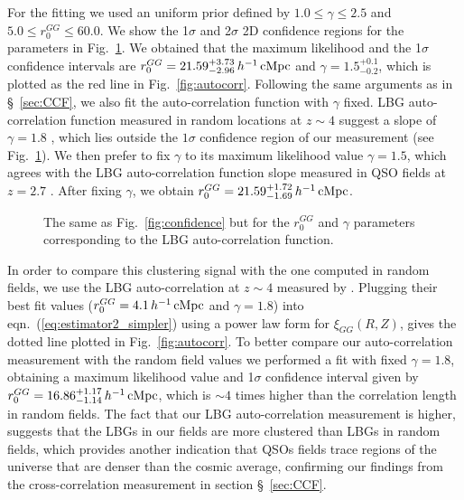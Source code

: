 \documentclass[iop, revtex4]{emulateapj}
\begin{document}
For the fitting we used an uniform prior
defined
by $1.0\leq \gamma \leq 2.5$ and $5.0\leq r^{GG}_{0} \leq 60.0$. We show 
the 1$\sigma$ and 2$\sigma$ 
2D confidence regions for the parameters in Fig.~\ref{fig:confidence_auto}. 
We obtained that the maximum
likelihood and the 1$\sigma$ confidence intervals are 
$r^{GG}_{0}=21.59^{+3.73}_{-2.96} \,h^{-1}\,{\rm cMpc}$ and
$\gamma=1.5^{+0.1}_{-0.2}$, which is
plotted as the red line in Fig.~\ref{fig:autocorr}.
Following the same arguments as in \S~\ref{sec:CCF}, 
we also fit the auto-correlation function with
$\gamma$ fixed. LBG auto-correlation function measured in random locations at $z\sim4$ 
suggest a slope of $\gamma=1.8$ \citep{Ouchi04b}, which lies
outside the  $1\sigma$ confidence region of our measurement (see
Fig.~\ref{fig:confidence_auto}). We then prefer to fix 
$\gamma$ to its maximum
likelihood value $\gamma=1.5$, which agrees with
the LBG auto-correlation function slope measured in QSO fields at $z=2.7$ \citep{Trainor12}. 
After fixing $\gamma$, we obtain
$r^{GG}_{0}=21.59^{+1.72}_{-1.69} \,h^{-1}\,{\rm cMpc}$.

\begin{figure}[t!]
\begin{center}
\caption{\label{fig:confidence_auto} The same as Fig.~\ref{fig:confidence} but for the $r^{GG}_{0}$ and $\gamma$ parameters corresponding to the LBG auto-correlation function.\\}
\end{center}
\end{figure} 

In order to
compare this clustering signal with the one computed in random fields,
we use the LBG auto-correlation at
$z\sim4$ measured by \citet{Ouchi04b}.
Plugging their best fit values ($r^{GG}_{0}=4.1 \,h^{-1}\,{\rm cMpc}$ and
$\gamma=1.8$) into eqn.~(\ref{eq:estimator2_simpler}) using a power law form for $\xi_{GG} (R,Z)$, gives the
dotted line plotted in  Fig.~\ref{fig:autocorr}. 
To better compare our auto-correlation measurement with the \citet{Ouchi04b} random field
values we performed a fit with fixed $\gamma=1.8$, obtaining a maximum likelihood value and 1$\sigma$ confidence interval given by $r^{GG}_{0}=16.86^{+1.17}_{-1.14} \,h^{-1}\,{\rm cMpc}$, which is $\sim4$ times higher than the correlation length in random fields.
The fact that our LBG auto-correlation measurement is higher, suggests that the LBGs in our fields are more clustered than LBGs in random fields, which provides another
indication that QSOs fields trace regions of the universe that are denser than the cosmic average,
confirming our findings from the cross-correlation measurement in section \S~\ref{sec:CCF}.
\end{document}
